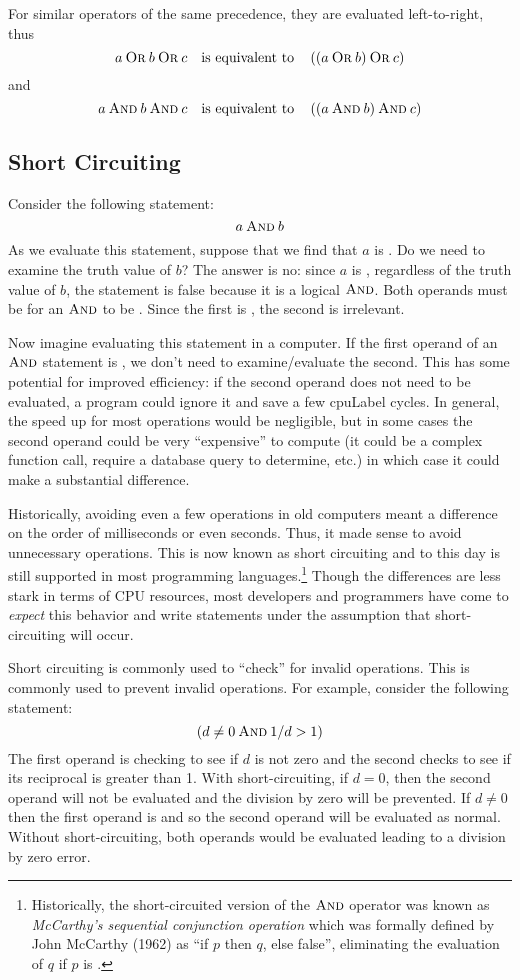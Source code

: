 For similar operators of the same precedence, they are evaluated left-to-right, thus
  $$a \mathbin{\textsc{Or}} b \mathbin{\textsc{Or}} c \quad \textrm{is equivalent to} \quad \left( (a \mathbin{\textsc{Or}} b) \mathbin{\textsc{Or}} c \right)$$
and 
  $$a \mathbin{\textsc{And}} b \mathbin{\textsc{And}} c \quad \textrm{is equivalent to} \quad \left( (a \mathbin{\textsc{And}} b) \mathbin{\textsc{And}} c \right)$$

\subsection{Short Circuiting}

Consider the following statement:
  $$a \mathbin{\textsc{And}} b$$
As we evaluate this statement, suppose that we find that $a$ is \False.  Do we need 
to examine the truth value of $b$?  The answer is no: since $a$ is \False, regardless 
of the truth value of $b$, the statement is false because it is a logical $\mathbin{\textsc{And}}$.  Both
operands must be \True for an $\mathbin{\textsc{And}}$ to be \True.  Since the first is \False, the second
is irrelevant.  

Now imagine evaluating this statement in a computer.  If the first operand of an $\mathbin{\textsc{And}}$
statement is \False, we don't need to examine/evaluate the second.  This has some
potential for improved efficiency: if the second operand does not need to be evaluated, 
a program could ignore it and save a few \gls{cpuLabel} cycles.  In general, the speed up
for most operations would be negligible, but in some cases the second operand could
be very ``expensive'' to compute (it could be a complex function call, require a database 
query to determine, etc.) in which case it could make a substantial difference.

Historically, avoiding even a few operations in old computers meant 
a difference on the
order of milliseconds or even seconds.  Thus, it made sense to avoid unnecessary
operations.  This is now known as \gls{short circuiting} and to this day is still supported
in most programming languages.\footnote{ Historically, the short-circuited 
version of the $\mathbin{\textsc{And}}$ operator was known as \emph{McCarthy's sequential 
conjunction operation} which was formally defined by John McCarthy (1962) 
as ``if $p$ then $q$, else false'', eliminating the evaluation
of $q$ if $p$ is \False \cite{Mccarthy62towardsa}.}  Though the differences are less stark in
terms of CPU resources, most developers and programmers have come to \emph{expect}
this behavior and write statements under the assumption that short-circuiting will occur.

Short circuiting is commonly used to ``check'' for invalid operations.  This is commonly 
used to prevent invalid operations.  For example, consider the following statement:
  $$(d \neq 0 \mathbin{\textsc{And}} 1 / d > 1)$$
The first operand is checking to see if $d$ is not zero and the second checks to see if
its reciprocal is greater than 1.  With short-circuiting, if $d = 0$, then the second operand
will not be evaluated and the division by zero will be prevented.  If $d \neq 0$ then the
first operand is \True and so the second operand will be evaluated as normal.  Without
short-circuiting, both operands would be evaluated leading to a division by zero error.

